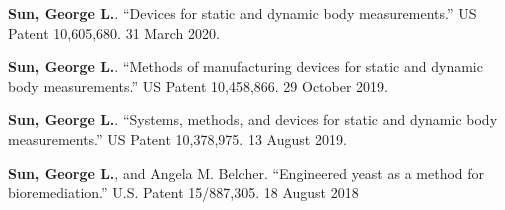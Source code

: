 
\begin{cvparagraph}
\textbf{Sun, George L.}. ``Devices for static and dynamic body measurements.'' US Patent 10,605,680. 31 March 2020.

\textbf{Sun, George L.}. ``Methods of manufacturing devices for static and dynamic body measurements.'' US Patent 10,458,866. 29 October 2019.

\textbf{Sun, George L.}. ``Systems, methods, and devices for static and dynamic body measurements.'' US Patent 10,378,975. 13 August 2019.

\textbf{Sun, George L.}, and Angela M. Belcher. ``Engineered yeast as a method for bioremediation.'' U.S. Patent 15/887,305. 18 August 2018

\end{cvparagraph}
